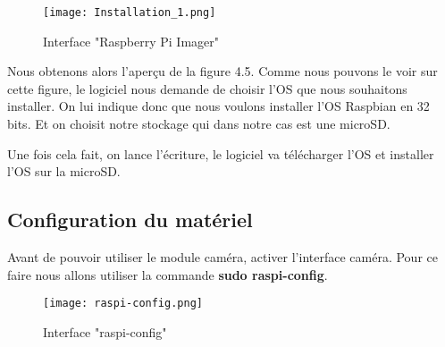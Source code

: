             \begin{figure}[ht]
                \centering
                \texttt{[image: Installation\_1.png]} 
                \caption{Interface "Raspberry Pi Imager"}
            \end{figure}

            Nous obtenons alors l'aperçu de la figure 4.5.
            Comme nous pouvons le voir sur cette figure, le logiciel nous demande de choisir l'OS que nous souhaitons installer.
            On lui indique donc que nous voulons installer l'OS Raspbian en 32 bits. Et on choisit notre stockage qui dans notre cas est une microSD.

            \vspace{0.2cm}

            Une fois cela fait, on lance l'écriture, le logiciel va télécharger l'OS et installer l'OS sur la microSD.

    
            \subsection{Configuration du matériel}
            Avant de pouvoir utiliser le module caméra, activer l'interface caméra.
            Pour ce faire nous allons utiliser la commande \textbf{sudo raspi-config}.

            \begin{figure}[ht]
                \centering
                \texttt{[image: raspi-config.png]} 
                \caption{Interface "raspi-config"}
            \end{figure}

